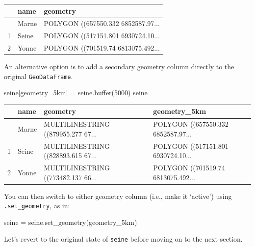 \documentclass[
  letterpaper,
]{krantz}
\newenvironment{Shaded}{\begin{snugshade}}{\end{snugshade}}
\newcommand{\BuiltInTok}[1]{\textcolor[rgb]{0.00,0.23,0.31}{#1}}
\newcommand{\DecValTok}[1]{\textcolor[rgb]{0.68,0.00,0.00}{#1}}
\newcommand{\NormalTok}[1]{\textcolor[rgb]{0.00,0.23,0.31}{#1}}
\newcommand{\OperatorTok}[1]{\textcolor[rgb]{0.37,0.37,0.37}{#1}}
\newcommand{\StringTok}[1]{\textcolor[rgb]{0.13,0.47,0.30}{#1}}
\begin{document}
\begin{longtable}[]{@{}lll@{}}
\toprule\noalign{}
& name & geometry \\
\midrule\noalign{}
\endhead
\bottomrule\noalign{}
\endlastfoot
0 & Marne & POLYGON ((657550.332 6852587.97... \\
1 & Seine & POLYGON ((517151.801 6930724.10... \\
2 & Yonne & POLYGON ((701519.74 6813075.492... \\
\end{longtable}

An alternative option is to add a secondary geometry column directly to
the original \texttt{GeoDataFrame}.

\begin{Shaded}
\begin{Highlighting}[]
\NormalTok{seine[}\StringTok{\textquotesingle{}geometry\_5km\textquotesingle{}}\NormalTok{] }\OperatorTok{=}\NormalTok{ seine.}\BuiltInTok{buffer}\NormalTok{(}\DecValTok{5000}\NormalTok{)}
\NormalTok{seine}
\end{Highlighting}
\end{Shaded}

\begin{longtable}[]{@{}llll@{}}
\toprule\noalign{}
& name & geometry & geometry\_5km \\
\midrule\noalign{}
\endhead
\bottomrule\noalign{}
\endlastfoot
0 & Marne & MULTILINESTRING ((879955.277 67... & POLYGON ((657550.332
6852587.97... \\
1 & Seine & MULTILINESTRING ((828893.615 67... & POLYGON ((517151.801
6930724.10... \\
2 & Yonne & MULTILINESTRING ((773482.137 66... & POLYGON ((701519.74
6813075.492... \\
\end{longtable}

You can then switch to either geometry column (i.e., make it `active')
using \texttt{.set\_geometry}, as in:

\begin{Shaded}
\begin{Highlighting}[]
\NormalTok{seine }\OperatorTok{=}\NormalTok{ seine.set\_geometry(}\StringTok{\textquotesingle{}geometry\_5km\textquotesingle{}}\NormalTok{)}
\end{Highlighting}
\end{Shaded}

Let's revert to the original state of \texttt{seine} before moving on to
the next section.
\end{document}

